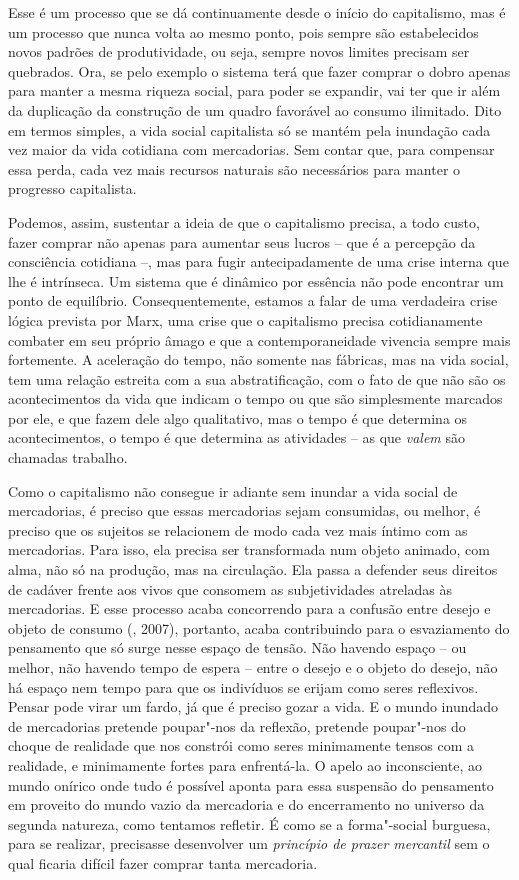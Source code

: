 {Esse é um processo que se dá continuamente desde o início do
capitalismo, mas é um processo que nunca volta ao mesmo ponto, pois
sempre são estabelecidos novos padrões de produtividade, ou seja, sempre
novos limites precisam ser quebrados. Ora, se pelo exemplo o sistema
terá que fazer comprar o dobro apenas para manter a mesma riqueza
social, para poder se expandir, vai ter que ir além da duplicação da
construção de um quadro favorável ao consumo ilimitado. Dito em termos
simples, a vida social capitalista só se mantém pela inundação cada vez
maior da vida cotidiana com mercadorias. Sem contar que, para compensar
essa perda, cada vez mais recursos naturais são necessários para manter
o progresso capitalista.

Podemos, assim, sustentar a ideia de que o capitalismo precisa, a todo
custo, fazer comprar não apenas para aumentar seus lucros -- que é a
percepção da consciência cotidiana --, mas para fugir antecipadamente de
uma crise interna que lhe é intrínseca. Um sistema que é dinâmico por
essência não pode encontrar um ponto de equilíbrio. Consequentemente,
estamos a falar de uma verdadeira crise lógica prevista por Marx, uma
crise que o capitalismo precisa cotidianamente combater em seu próprio
âmago e que a contemporaneidade vivencia sempre mais fortemente. A
aceleração do tempo, não somente nas fábricas, mas na vida social, tem
uma relação estreita com a sua abstratificação, com o fato de que não
são os acontecimentos da vida que indicam o tempo ou que são
simplesmente marcados por ele, e que fazem dele algo qualitativo, mas o
tempo é que determina os acontecimentos, o tempo é que determina as
atividades -- as que \emph{valem} são chamadas trabalho.

Como o capitalismo não consegue ir adiante sem inundar a vida social de
mercadorias, é preciso que essas mercadorias sejam consumidas, ou
melhor, é preciso que os sujeitos se relacionem de modo cada vez mais
íntimo com as mercadorias. Para isso, ela precisa ser transformada num
objeto animado, com alma, não só na produção, mas na circulação. Ela
passa a defender seus direitos de cadáver frente aos vivos que consomem
as subjetividades atreladas às mercadorias. E esse processo acaba
concorrendo para a confusão entre desejo e objeto de consumo (,
2007), portanto, acaba contribuindo para o esvaziamento do pensamento
que só surge nesse espaço de tensão. Não havendo espaço -- ou melhor,
não havendo tempo de espera -- entre o desejo e o objeto do desejo, não
há espaço nem tempo para que os indivíduos se erijam como seres
reflexivos. Pensar pode virar um fardo, já que é preciso gozar a vida. E
o mundo inundado de mercadorias pretende poupar"-nos da reflexão,
pretende poupar"-nos do choque de realidade que nos constrói como seres
minimamente tensos com a realidade, e minimamente fortes para
enfrentá-la. O apelo ao inconsciente, ao mundo onírico onde tudo é
possível aponta para essa suspensão do pensamento em proveito do mundo
vazio da mercadoria e do encerramento no universo da segunda natureza,
como tentamos refletir. É como se a forma"-social burguesa, para se
realizar, precisasse desenvolver um \emph{princípio de prazer mercantil}
sem o qual ficaria difícil fazer comprar tanta mercadoria.

}
